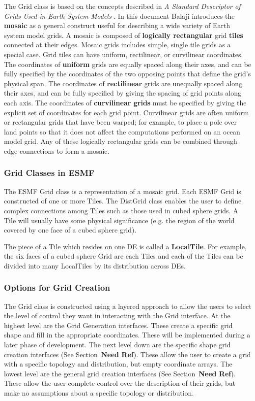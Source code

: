 The Grid class is based on the concepts described in {\it A Standard Descriptor 
of Grids Used in Earth System Models} \cite{BalajiGridSpec}.  In this document
Balaji introduces the {\bf mosaic} as a general construct useful for
describing a wide variety of Earth system
model grids.  A mosaic is composed of {\bf logically rectangular} grid {\bf tiles}
connected at their edges.  Mosaic grids includes simple, single tile grids as
a special case.  Grid tiles can have uniform, rectilinear, or curvilinear
coordinates.  The coordinates of {\bf uniform} grids are equally spaced along their
axes, and can be fully specified by the coordinates of the two opposing points
that define the grid's physical span.  The coordinates of {\bf rectilinear} grids
are unequally spaced along their axes, and can be fully specified by giving
the spacing of grid points along each axis.  The coordinates of {\bf curvilinear 
grids} must be specified by giving the explicit set of coordinates for each
grid point.  Curvilinear grids are often uniform or rectangular grids that 
have been warped; for example, to place a pole over land points so that it
does not affect the computations performed on an ocean model grid.  Any of
these logically rectangular grids can be combined through edge connections
to form a mosaic.

\subsubsection{Grid Classes in ESMF}

The ESMF Grid class is a representation of a mosaic grid.  Each ESMF
Grid is constructed of one or more Tiles. The DistGrid class enables
the user to define complex connections among Tiles such as those used in
cubed sphere grids.  A Tile will usually have some physical significance
(e.g. the region of the world covered by one face of a cubed sphere grid).  

The piece of a Tile which resides on one DE is
called a {\bf LocalTile}. For example, the six faces of a cubed sphere
Grid are each Tiles and each of the Tiles can be divided into many
LocalTiles by its distribution across DEs. 

\subsubsection{Options for Grid Creation} 

The Grid class is constructed using a layered approach to allow the 
users to select the level of control they want in interacting with
the Grid interface. At the highest level are the Grid Generation interfaces. 
These create a specific grid shape and fill in the appropriate coordinates. 
These will be implemented during a later phase of development. The
next level down are the specific shape grid creation interfaces (See Section~\textbf{Need Ref}). 
These allow the user to create a grid with a specific topology and 
distribution, but empty coordinate arrays. The lowest level are
the general grid creation interfaces (See Section~\textbf{Need Ref}). These allow the user
complete control over the description of their grids, but
make no assumptions about a specific topology or distribution. 

